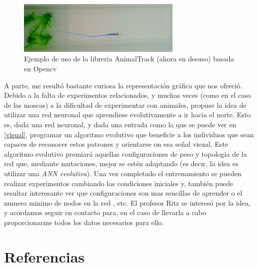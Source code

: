 \documentclass[1p]{elsarticle}
\begin{document}
\begin{figure}
	\centering
	\includegraphics[width=0.7\textwidth]{animal_track}
	\caption{Ejemplo de uso de la libreria AnimalTrack (ahora en desuso) basada en Opencv}
	\label{animal_1}
\end{figure}

A parte, me resultó bastante curiosa la representación gráfica que nos ofreció. Debido a la falta de experimentos relacionados, y muchas veces (como en el caso de las moscas) a la dificultad de experimentar con animales, propuse la idea de utilizar una red neuronal que aprendiese evolutivamente a ir hacia el norte. Esto es, dada una red neuronal, y dada una entrada como la que se puede ver en \ref{visual}, programar un algoritmo evolutivo que beneficie a los individuos que sean capaces de reconocer estos patrones y orientarse on esa señal visual. Este algoritmo evolutivo premiará aquellas configuraciones de peso y topología de la red que, mediante mutaciones, mejor se estén adaptando (es decir, la idea es utilizar una \textit{ANN evolutiva}). Una vez completado el entrenamiento se pueden realizar experimentos cambiando las condiciones iniciales y, también puede resultar interesante ver que configuraciones son mas sencillas de aprender o el numero minimo de nodos en la red , etc. 
El profesor Ritz se interesó por la idea, y acordamos seguir en contacto para, en el caso de llevarla a cabo proporcionarme todos los datos necesarios para ello.



\section*{Referencias}


\end{document}
